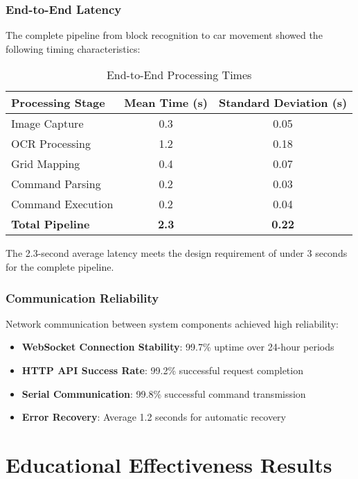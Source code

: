 \subsubsection{End-to-End Latency}

The complete pipeline from block recognition to car movement showed the following timing characteristics:

\begin{table}[H]
\centering
\caption{End-to-End Processing Times}
\begin{tabular}{|l|c|c|}
\hline
\textbf{Processing Stage} & \textbf{Mean Time (s)} & \textbf{Standard Deviation (s)} \\
\hline
Image Capture & 0.3 & 0.05 \\
OCR Processing & 1.2 & 0.18 \\
Grid Mapping & 0.4 & 0.07 \\
Command Parsing & 0.2 & 0.03 \\
Command Execution & 0.2 & 0.04 \\
\hline
\textbf{Total Pipeline} & \textbf{2.3} & \textbf{0.22} \\
\hline
\end{tabular}
\label{tab:latency}
\end{table}

The 2.3-second average latency meets the design requirement of under 3 seconds for the complete pipeline.

\subsubsection{Communication Reliability}

Network communication between system components achieved high reliability:

\begin{itemize}
    \item \textbf{WebSocket Connection Stability}: 99.7\% uptime over 24-hour periods
    \item \textbf{HTTP API Success Rate}: 99.2\% successful request completion
    \item \textbf{Serial Communication}: 99.8\% successful command transmission
    \item \textbf{Error Recovery}: Average 1.2 seconds for automatic recovery
\end{itemize}

\section{Educational Effectiveness Results}

